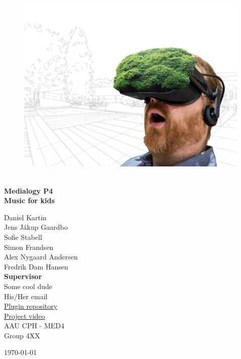\begin{titlepage}
			
\addtolength{\voffset}{2cm}

\begin{figure}[H]
\centering
\vspace{2cm}	%
\includegraphics[width=0.99\linewidth]{figure/Frontpage/gardenposterCropped.png}
\end{figure}

\mbox{}
\vfill
\renewcommand{\familydefault}{\sfdefault} \normalfont %
\HRule\\[0.1cm]
\textbf{{\small Medialogy P4\\ {\Huge Music for kids}}} \hspace{0.15cm}\\
\HRule\smallskip{}
\begin{multicols}{2}
{\Large Daniel Kartin\\Jens Jákup Gaardbo\\Sofie Stabell\\Simon Frandsen\\Alex Nygaard Andersen\\Fredrik Dam Hansen\columnbreak}\\
\setlength{\parskip}{2.4cm}
{\Large{\textbf{Supervisor}\\Some cool dude\\His/Her email}}\medskip\\
\href{https://github.com/totalfreak/medialogyp4code}{\color{blue}Plugin repository}\\
\href{https://youtu.be/wmZ-fhU4JIE}{\color{blue}Project video}\medskip
\\\small AAU CPH - 
MED4 \\
Group 4XX\\
\end{multicols}
\today
\renewcommand{\familydefault}{\rmdefault} \normalfont %
\end{titlepage}


